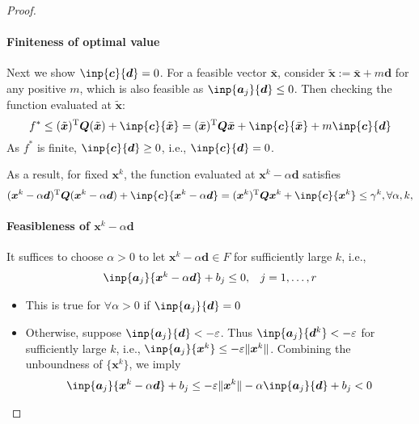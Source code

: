 \begin{proof}
\paragraph{Finiteness of optimal value}Next we show $\inp{\bm c}{\bm d}=0$. For a feasible vector $\bar{\bm x}$, consider $\tilde{\bm x}:=\bar{\bm x}+m\bm d$ for any positive $m$, which is also feasible as $\inp{\bm a_j}{\bm d}\le0$. Then checking the function evaluated at $\tilde{\bm x}$:
\[
f^*\le (\tilde{\bm x})\trans\bm Q(\tilde{\bm x})+\inp{\bm c}{\tilde{\bm x}}
=
(\bar{\bm x})\trans\bm Q\bar{\bm x}+\inp{\bm c}{\bar{\bm x}}+m\inp{\bm c}{\bm d}
\]
As $f^*$ is finite, $\inp{\bm c}{\bm d}\ge0$, i.e., $\inp{\bm c}{\bm d}=0$.

As a result, for fixed $\bm x^k$, the function evaluated at $\bm x^k-\alpha\bm d$ satisfies
\[
(\bm x^k-\alpha\bm d)\trans\bm Q(\bm x^k-\alpha\bm d)
+
\inp{\bm c}{\bm x^k-\alpha\bm d}=(\bm x^k)\trans\bm Q\bm x^k+\inp{\bm c}{\bm x^k}\le\gamma^k,\forall\alpha,k,
\]
\paragraph{Feasibleness of $\bm x^k-\alpha\bm d$}It suffices to choose $\alpha>0$ to let $\bm x^k-\alpha\bm d\in F$ for sufficiently large $k$, i.e., 
\[
\begin{array}{ll}
\inp{\bm a_j}{\bm x^k-\alpha\bm d}+b_j\le0,
&
j=1,\dots,r
\end{array}
\]
\begin{itemize}
\item
This is true for $\forall\alpha>0$ if $\inp{\bm a_j}{\bm d}=0$
\item
Otherwise, suppose $\inp{\bm a_j}{\bm d}<-\varepsilon$. Thus $\inp{\bm a_j}{\bm d^k}<-\varepsilon$ for sufficiently large $k$, i.e., $\inp{\bm a_j}{\bm x^k}\le-\varepsilon\|\bm x^k\|$. Combining the unboundness of $\{\bm x^k\}$, we imply
\[
\inp{\bm a_j}{\bm x^k-\alpha\bm d}+b_j\le-\varepsilon\|\bm x^k\|-\alpha\inp{\bm a_j}{\bm d}+b_j<0
\]


\end{itemize}



\end{proof}


















